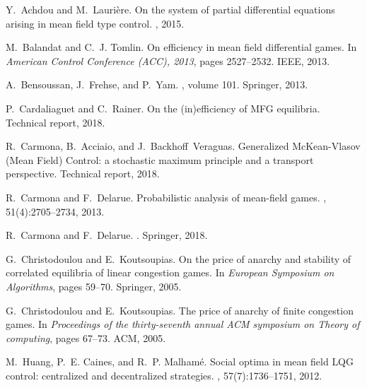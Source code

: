 \documentclass[11pt]{article}
\begin{document}
\begin{thebibliography}{10}

Y.~Achdou and M.~Lauri\`{e}re.
\newblock On the system of partial differential equations arising in mean field
  type control.
, 2015.

M.~Balandat and C.~J. Tomlin.
\newblock On efficiency in mean field differential games.
\newblock In {\em American Control Conference (ACC), 2013}, pages 2527--2532.
  IEEE, 2013.

A.~Bensoussan, J.~Frehse, and P.~Yam.
, volume
  101.
\newblock Springer, 2013.

P.~Cardaliaguet and C.~Rainer.
\newblock On the (in)efficiency of {MFG} equilibria.
\newblock Technical report, 2018.

R.~Carmona, B.~Acciaio, and J.~Backhoff~Veraguas.
\newblock Generalized {M}c{K}ean-{V}lasov ({M}ean {F}ield) {C}ontrol: a
  stochastic maximum principle and a transport perspective.
\newblock Technical report, 2018.

R.~Carmona and F.~Delarue.
\newblock Probabilistic analysis of mean-field games.
, 51(4):2705--2734,
  2013.

R.~Carmona and F.~Delarue.
.
\newblock Springer, 2018.

G.~Christodoulou and E.~Koutsoupias.
\newblock On the price of anarchy and stability of correlated equilibria of
  linear congestion games.
\newblock In {\em European Symposium on Algorithms}, pages 59--70. Springer,
  2005.

G.~Christodoulou and E.~Koutsoupias.
\newblock The price of anarchy of finite congestion games.
\newblock In {\em Proceedings of the thirty-seventh annual ACM symposium on
  Theory of computing}, pages 67--73. ACM, 2005.

M.~Huang, P.~E. Caines, and R.~P. Malham{\'e}.
\newblock Social optima in mean field {LQG} control: centralized and
  decentralized strategies.
, 57(7):1736--1751, 2012.


\end{thebibliography}
\end{document}

